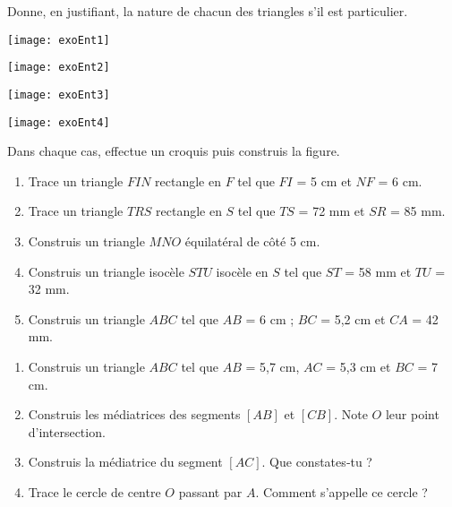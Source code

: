 

\begin{exercice}[Reconnaître]
Donne, en justifiant, la nature de chacun des triangles s'il est particulier.
\begin{colenumerate}{4}
\item \texttt{[image: exoEnt1]}
\item \texttt{[image: exoEnt2]}
\item \texttt{[image: exoEnt3]}
\item \texttt{[image: exoEnt4]}
\end{colenumerate}
\end{exercice}



\begin{exercice}
Dans chaque cas, effectue un croquis puis construis la figure.
\begin{enumerate}
\item Trace un triangle $FIN$ rectangle en $F$ tel que $FI$ = 5 cm et $NF$ = 6 cm.
\item Trace un triangle $TRS$ rectangle en $S$ tel que $TS$ = 72 mm et $SR$ = 85 mm.
\item Construis un triangle $MNO$ équilatéral de côté 5 cm.
\item Construis un triangle isocèle $STU$ isocèle en $S$ tel que $ST$ = 58 mm et $TU$ = 32 mm.
\item Construis un triangle $ABC$ tel que $AB$ = 6 cm ; $BC$ = 5,2 cm et $CA$ = 42 mm.
\end{enumerate}
\end{exercice}



\begin{exercice}
\begin{enumerate}
\item Construis un triangle $ABC$ tel que $AB$ = 5,7 cm, $AC$ = 5,3 cm et $BC$ = 7 cm.
\item Construis les médiatrices des segments $[AB]$ et $[CB]$. Note $O$ leur point d'intersection.
\item Construis la médiatrice du segment $[AC]$. Que constates‑tu ?
\item Trace le cercle de centre $O$ passant par $A$. Comment s'appelle ce cercle ?
\end{enumerate}
\end{exercice}



